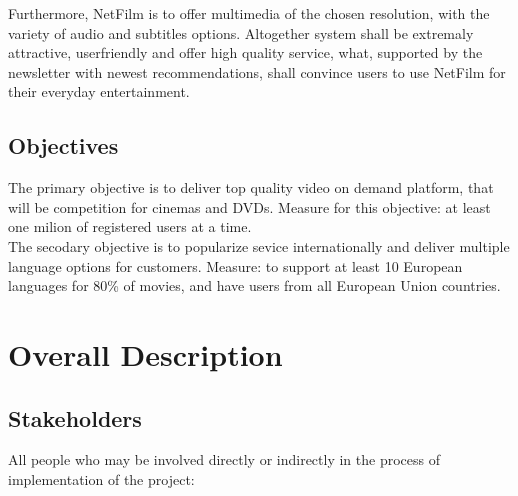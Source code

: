 \documentclass{scrreprt}
\begin{document}
Furthermore, NetFilm is to offer multimedia of the chosen resolution, with the variety of audio and subtitles options. Altogether system shall be extremaly attractive, userfriendly and offer high quality service, what, supported by the newsletter with newest recommendations, shall convince users to use NetFilm for their everyday entertainment.

\section{Objectives}

The primary objective is to deliver top quality video on demand platform, that will be competition for cinemas and DVDs.
Measure for this objective: at least one milion of registered users at a time.
\\

The secodary objective is to popularize sevice internationally and deliver multiple language options for customers.
Measure: to support at least 10 European languages for 80\% of movies, and have users from all European Union countries.


\chapter{Overall Description}

\section{Stakeholders}

All people who may be involved directly or indirectly in the process of implementation of the project:
\end{document}
